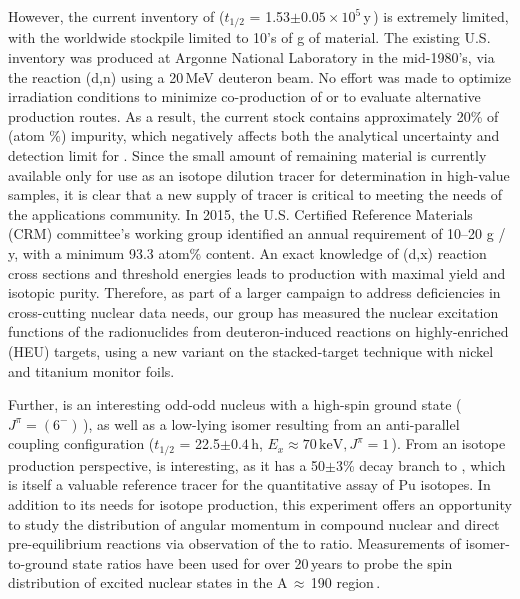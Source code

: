 However, the current  inventory of  ($t_{1/2}$ = 1.53$\pm0.05\times10^5$\,y\,\cite{XXX}) is extremely limited, with the worldwide stockpile limited to 10's of \mmicro g of material. 
The existing U.S. inventory was produced at Argonne National Laboratory  in the mid-1980's,  via the reaction (d,n) using a 20\,MeV deuteron beam. 
No effort was made to optimize irradiation conditions to minimize co-production of    or to evaluate alternative production routes. 
As a result, the current  stock contains approximately 20\% of  (atom \%) impurity, which negatively affects both the analytical uncertainty and detection limit for . 
Since the small amount of remaining material is currently available only for use as an isotope dilution tracer for  determination in high-value samples, it is clear that a new supply of  tracer is critical to meeting the needs of the applications community.
In 2015, the U.S. Certified Reference Materials (CRM) committee's  working group identified  an annual requirement of 10--20 \mmicro g / y, with a minimum 93.3 atom\%  content. 
An exact knowledge of (d,x) reaction cross sections and threshold energies leads to   production with maximal yield and isotopic purity. 
Therefore, as part of a larger campaign to address deficiencies in cross-cutting nuclear data needs, our group has measured the nuclear excitation functions of the radionuclides  from deuteron-induced reactions on highly-enriched  (HEU) targets, using a new variant on the  stacked-target technique  with nickel and titanium monitor foils.

Further,  is an interesting odd-odd nucleus with a high-spin ground state ($J^\pi=(6^-)$\,\cite{XXX}), as well as a low-lying isomer resulting from an anti-parallel coupling configuration ($t_{1/2}$ = 22.5$\pm0.4$\,h, $E_x\approx70\,\text{keV}, J^\pi=1$\,\cite{XXX}).
From an isotope production perspective,  is interesting, as it has a 50$\pm$3\% decay branch \cite{XXX} to , which is itself a valuable reference tracer for the quantitative assay of Pu isotopes.
In addition to its needs for isotope production,  this experiment  offers an opportunity to study the distribution of angular momentum in compound nuclear and direct pre-equilibrium reactions via observation of the   to     ratio.
Measurements of isomer-to-ground state ratios have been used for over 20\,years to probe the spin distribution of excited nuclear states in the A\,$\approx$\,190 region\,\cite{PhysRevC.73.034613,PhysRevC.45.1171}.


